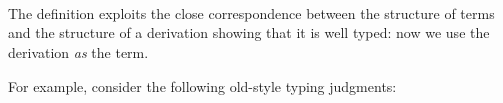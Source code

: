 \begin{fence}
\begin{code}
\AgdaSpace{}%
\AgdaSpace{}%
\<%
\\
%
\>[4]%
\>[209I]\AgdaSpace{}%
\AgdaOperator{\AgdaInductiveConstructor{,}}\AgdaSpace{}%
\AgdaSpace{}%
\AgdaSpace{}%
\<%
\\
\>[.][@{}l@{}]\<[209I]%
\>[6]\AgdaComment{----------}\<%
\\
%
\>[4]\AgdaSpace{}%
\AgdaSpace{}%
\AgdaSpace{}%
\<%
\\
%
\\[\AgdaEmptyExtraSkip]%
%
\>[2]\AgdaSpace{}%
\AgdaSymbol{:}\AgdaSpace{}%
\AgdaSpace{}%
\AgdaSymbol{\{}\AgdaSpace{}%
\AgdaSymbol{\}}\<%
\\
\>[2][@{}l@{\AgdaIndent{0}}]%
\>[4]%
\>[221I]\AgdaSpace{}%
\AgdaOperator{\AgdaInductiveConstructor{,}}\AgdaSpace{}%
\AgdaSpace{}%
\AgdaSpace{}%
\<%
\\
\>[.][@{}l@{}]\<[221I]%
\>[6]\AgdaComment{---------}\<%
\\
%
\>[4]\AgdaSpace{}%
\AgdaSpace{}%
\AgdaSpace{}%
\<%
\end{code}
\end{fence}

The definition exploits the close correspondence between the structure
of terms and the structure of a derivation showing that it is well
typed: now we use the derivation \emph{as} the term.

For example, consider the following old-style typing judgments:


